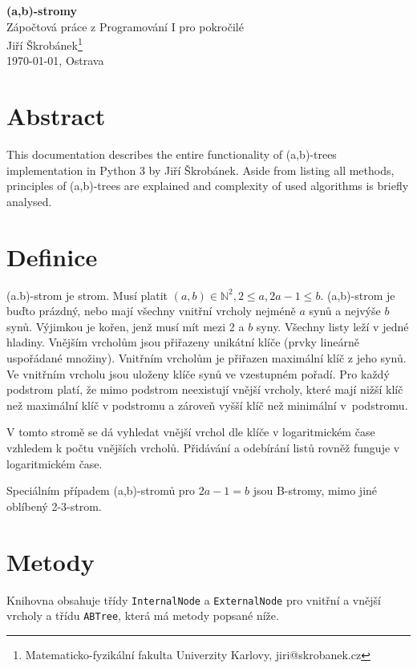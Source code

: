 \documentclass[a4paper,11pt,openany]{article}
\begin{document}
\begin{center}
{\huge \textbf{(a,b)-stromy}}\\\vspace{\baselineskip}Zápočtová práce z Programování I pro pokročilé\\
\vspace{10mm} {\large Jiří Škrobánek\footnote[1]{Matematicko-fyzikální fakulta Univerzity Karlovy, {\ttfamily jiri@skrobanek.cz}}}\\
\vspace{10mm}\today, Ostrava
\end{center}
	
\section*{Abstract}
	
This documentation describes the entire functionality of (a,b)-trees implementation in Python 3 by Jiří Škrobánek. Aside from listing all methods, principles of (a,b)-trees are explained and complexity of used algorithms is briefly analysed.
	
\tableofcontents
	
\section{Definice}
(a.b)-strom je strom. Musí platit $(a,b) \in \mathbb{N}^2, 2 \leq a, 2a - 1 \leq b $. (a,b)-strom je buďto prázdný, nebo mají všechny vnitřní vrcholy nejméně $a$ synů a nejvýše $b$ synů. Výjimkou je kořen, jenž musí mít mezi 2 a $b$ syny. Všechny listy leží v jedné hladiny. Vnějším vrcholům jsou přiřazeny unikátní klíče (prvky lineárně uspořádané množiny). Vnitřním vrcholům je přiřazen maximální klíč z jeho synů. Ve vnitřním vrcholu jsou uloženy klíče synů ve vzestupném pořadí. Pro každý podstrom platí, že mimo podstrom neexistují vnější vrcholy, které mají nižší klíč než maximální klíč v podstromu a zároveň vyšší klíč než minimální v~podstromu.
	
V tomto stromě se dá vyhledat vnější vrchol dle klíče v logaritmickém čase vzhledem k počtu vnějších vrcholů. Přidávání a odebírání listů rovněž funguje v logaritmickém čase.
	
Speciálním případem (a,b)-stromů pro $2a-1=b$ jsou B-stromy, mimo jiné oblíbený 2-3-strom.
	
\section{Metody}
Knihovna obsahuje třídy \texttt{InternalNode} a \texttt{ExternalNode} pro vnitřní a vnější vrcholy a třídu \texttt{ABTree}, která má metody popsané níže.
	
\end{document}
